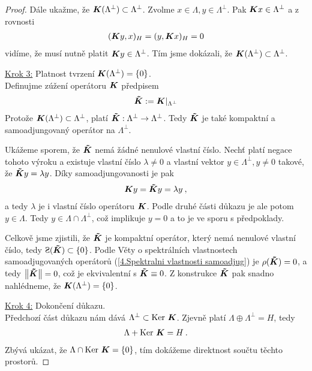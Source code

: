 \begin{proof}
Dále ukažme, že $\boldsymbol{K}(\Lambda^\bot) \subset \Lambda^\bot$. Zvolme $x \in \Lambda, y \in \Lambda^\bot$. Pak $\boldsymbol{K} x \in \Lambda^\bot$ a z rovnosti \begin{align*}
    (\boldsymbol{K} y,x)_H = (y, \boldsymbol{K} x)_H =0
\end{align*}
vidíme, že musí nutně platit $\boldsymbol{K} y \in \Lambda^\bot$. Tím jsme dokázali, že $\boldsymbol{K}(\Lambda^\bot) \subset \Lambda^{\bot}$.

\underline{Krok 3:} Platnost tvrzení $\boldsymbol{K}(\Lambda^\bot) = \lbrace 0 \rbrace$. \\
Definujme zúžení operátoru $\boldsymbol{K}$ předpisem \begin{align*}
    \boldsymbol{\tilde K} := \boldsymbol{K}|_{\Lambda^\bot}
\end{align*}
Protože $\boldsymbol{K}(\Lambda^\bot) \subset \Lambda^{\bot}$, platí $\boldsymbol{\tilde K} : \Lambda^{\bot} \to \Lambda^{\bot}$. Tedy $\boldsymbol{\tilde K}$ je také kompaktní a samoadjungovaný operátor na $\Lambda^{\bot}$.

Ukážeme sporem, že $\boldsymbol{\tilde K}$ nemá žádné nenulové vlastní číslo. Nechť platí negace tohoto výroku a existuje vlastní číslo $\lambda \neq 0$ a vlastní vektor $y \in \Lambda^{\bot} , y \neq 0$ takové, že $ \boldsymbol{\tilde K} y = \lambda y$. Díky samoadjungovanosti je pak
\begin{align*}
    \boldsymbol{K} y = \boldsymbol{\tilde K} y = \lambda y\:,
\end{align*}
a tedy $\lambda$ je i vlastní číslo operátoru $\boldsymbol{K}$. Podle druhé části důkazu je ale potom $y \in \Lambda$. Tedy $y \in \Lambda \cap \Lambda^\bot$, což implikuje $y=0$ a to je ve sporu s předpoklady.

Celkově jsme zjistili, že $\boldsymbol{\tilde K}$ je kompaktní operátor, který nemá nenulové vlastní číslo, tedy $\Sp(\map{\tilde K}) \subset \{ 0 \}$. Podle Věty o spektrálních vlastnostech samoadjugovaných operátorů (\ref{4.Spektralni vlastnosti samoadjug}) je $\rho(\boldsymbol{\tilde K}) = 0$, a tedy  $\left\lVert\boldsymbol{\tilde K}\right\rVert =0$, což je ekvivalentní s $\boldsymbol{\tilde K} \equiv 0$. Z konstrukce $\boldsymbol{\tilde K}$ pak snadno nahlédneme, že $\boldsymbol{K}(\Lambda^\bot)= \{0 \}$.

\underline{Krok 4:} Dokončení důkazu. \\
Předchozí část důkazu nám dává $\Lambda^\bot \subset \operatorname{Ker}\, \boldsymbol{K}$. Zjevně platí $\Lambda \oplus \Lambda^\bot = H$, tedy \begin{align*}
    \Lambda + \operatorname{Ker}\, \boldsymbol{K} = H \:.
\end{align*}
Zbývá ukázat, že $\Lambda \cap \operatorname{Ker}\, \boldsymbol{K} = \{0 \}$, tím dokážeme direktnost součtu těchto prostorů.


\end{proof}
